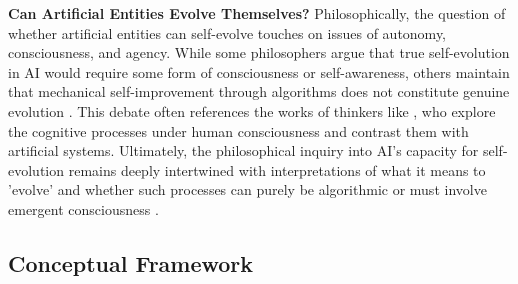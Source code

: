 \documentclass[sn-basic, Numbered]{sn-jnl}%
\theoremstyle{thmstyleone}%
\theoremstyle{thmstyletwo}%
\theoremstyle{thmstylethree}%
\begin{document}
\noindent\textbf{Can Artificial Entities Evolve Themselves?}
Philosophically, the question of whether artificial entities can self-evolve touches on issues of autonomy, consciousness, and agency. While some philosophers argue that true self-evolution in AI would require some form of consciousness or self-awareness, others maintain that mechanical self-improvement through algorithms does not constitute genuine evolution \cite{chalmers1997conscious}. This debate often references the works of thinkers like  \citet{dennett1993consciousness}, who explore the cognitive processes under human consciousness and contrast them with artificial systems. Ultimately, the philosophical inquiry into AI's capacity for self-evolution remains deeply intertwined with interpretations of what it means to 'evolve' and whether such processes can purely be algorithmic or must involve emergent consciousness \cite{searle1986minds}.




\subsection{Conceptual Framework}
\label{sec:conceptual framework}
\end{document}
